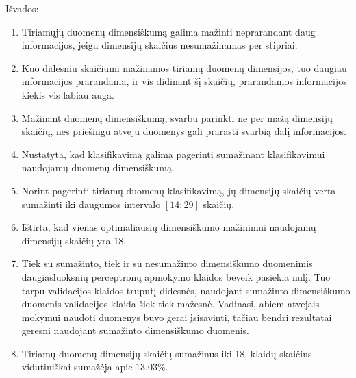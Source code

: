 \documentclass{VUMIFPSbakalaurinis}
\begin{document}
Išvados:
\begin{enumerate}
	\item Tiriamųjų duomenų dimensiškumą galima mažinti neprarandant daug informacijos, jeigu dimensijų skaičius nesumažinamas per stipriai.
	\item Kuo didesniu skaičiumi mažinamos tiriamų duomenų dimensijos, tuo daugiau informacijos prarandama, ir vis didinant šį skaičių, prarandamos informacijos kiekis vis labiau auga.
	\item Mažinant duomenų dimensiškumą, svarbu parinkti ne per mažą dimensijų skaičių, nes priešingu atveju duomenys gali prarasti svarbią dalį informacijos.
	\item Nustatyta, kad klasifikavimą galima pagerinti sumažinant klasifikavimui naudojamų duomenų dimensiškumą.
	\item Norint pagerinti tiriamų duomenų klasifikavimą, jų dimensijų skaičių verta sumažinti iki daugumos intervalo $[14; 29]$ skaičių.
	\item Ištirta, kad vienas optimaliausių dimensiškumo mažinimui naudojamų dimensijų skaičių yra 18.

	\item Tiek su sumažinto, tiek ir su nesumažinto dimensiškumo duomenimis daugiasluoksnių perceptronų apmokymo klaidos beveik pasiekia nulį. Tuo tarpu validacijos klaidos truputį didesnės, naudojant sumažinto dimensiškumo duomenis validacijos klaida šiek tiek mažesnė. Vadinasi, abiem atvejais mokymui naudoti duomenys buvo gerai įsisavinti, tačiau bendri rezultatai geresni naudojant sumažinto dimensiškumo duomenis.
	\item Tiriamų duomenų dimensijų skaičių sumažinus iki 18, klaidų skaičius vidutiniškai sumažėja apie $13.03\%$.
\end{enumerate}



\printbibliography[heading=bibintoc]  %

\end{document}
